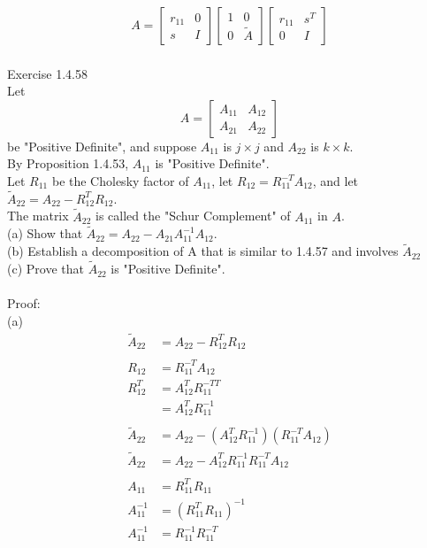 \documentclass{article}
\begin{document}
	\begin{align*}
	A=\begin{bmatrix}r_{11}&0\\s&I\end{bmatrix}\begin{bmatrix}1&0\\0&\tilde{A}\end{bmatrix}\begin{bmatrix}r_{11}&s^T\\0&I\end{bmatrix}
	\end{align*}
	\\
	Exercise 1.4.58\\
	Let $$A = \begin{bmatrix}A_{11} & A_{12}\\A_{21}&A_{22}\end{bmatrix}$$ be "Positive Definite", and suppose $A_{11}$ is $j \times j$ and 
	$A_{22}$ is $k \times k$.\\
	By Proposition 1.4.53, $A_{11}$ is "Positive Definite".\\
	Let $R_{11}$ be the Cholesky factor of $A_{11}$, let $R_{12} = 
	 R_{11}^{-T}A_{12}$, and let $\tilde{A}_{22} = A_{22} - R_{12}^TR_{12}$.\\
	The matrix $\tilde{A}_{22}$ is called the "Schur Complement" of $A_{11}$ in $A$.\\ 
	(a) Show that $\tilde{A}_{22} = A_{22} - A_{21}A_{11}^{-1}A_{12}$.\\ 
	(b) Establish a decomposition of A that is similar to 1.4.57 and involves $\tilde{A}_{22}$\\ 
	(c) Prove that $\tilde{A}_{22}$ is "Positive Definite".\\	
	\\
	Proof:\\
	(a)\\
	\begin{align*}
		\tilde{A}_{22} &= A_{22} - R_{12}^TR_{12}\\
		\\
		R_{12} &= R_{11}^{-T}A_{12}\\
		R_{12}^T &= A_{12}^TR_{11}^{-TT}\\
		&= A_{12}^{T}R_{11}^{-1}\\
		\\
		\tilde{A}_{22} &= A_{22} - (A_{12}^{T}R_{11}^{-1})(R_{11}^{-T}A_{12})\\
		\tilde{A}_{22} &= A_{22} - A_{12}^{T}R_{11}^{-1}R_{11}^{-T}A_{12}\\		
		\\
		A_{11} &= R_{11}^TR_{11}\\
		A_{11}^{-1} &= (R_{11}^TR_{11})^{-1}\\
		A_{11}^{-1} &= R_{11}^{-1}R_{11}^{-T}\\		
	\end{align*}	
\end{document}

